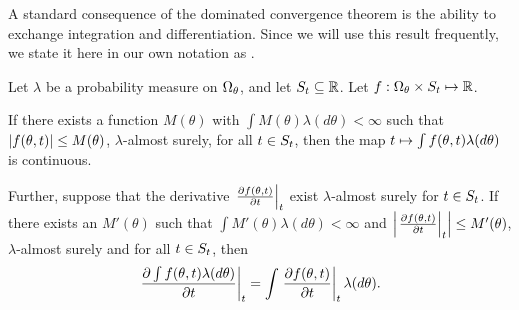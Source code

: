 
A standard consequence of the dominated convergence theorem is the ability to
exchange integration and differentiation.  Since we will use this result
frequently, we state it here in our own notation as .

\begin{thm}
\citep[Theorem 16.8]{billingsley:1986:probability}
%
Let $\lambda$ be a probability measure on $\Omega_{\theta}$, and let $S_t \subseteq
\mathbb{R}$.  Let $f:\Omega_{\theta} \times S_t \mapsto \mathbb{R}$.

If there exists a function $M(\theta)$ with $\int M(\theta) \lambda(d\theta) <
\infty$ such that $\left|f(\theta, t)\right| \le M(\theta)$, $\lambda$-almost surely,
for all $t \in S_t$, then the map $t \mapsto \int f(\theta, t)
\lambda(d\theta)$ is continuous.

Further, suppose that the derivative $\left.\frac{\partial f(\theta, t)}{\partial
t}\right\vert_{t}$ exist $\lambda$-almost surely for $t \in S_t$.  If there exists
an $M'(\theta)$ such that $\int M'(\theta) \lambda(d\theta) < \infty$ and
$\left|\left.\frac{\partial f(\theta, t)}{\partial t}\right\vert_{t}\right| \le M'(\theta)$,
$\lambda$-almost surely and for all $t \in S_t$, then
%
\begin{align*}
%
\fracat{\partial \int f(\theta, \t) \lambda(d\theta)}{\partial \t}{\t} =
     \int \fracat{\partial f(\theta, \t)}{\partial \t}{\t} \lambda(d\theta).
%
\end{align*}
%
\end{thm}



